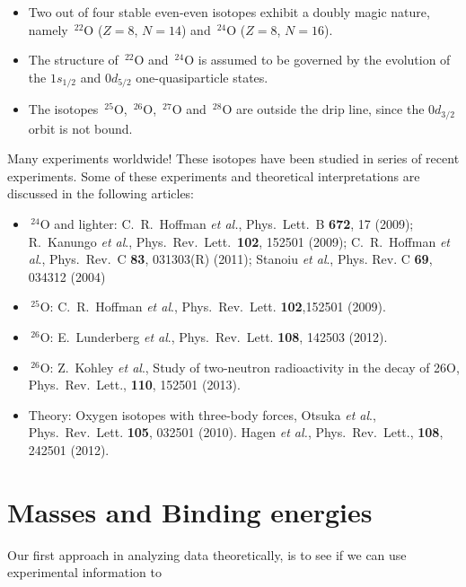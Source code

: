 \documentclass[%
twoside,                 %
final,                   %
10pt]{article}
\begin{document}
\begin{itemize}
\item Two out of four stable even-even isotopes exhibit a doubly magic nature, namely $\,{}^{22}\mbox{O}$ ($Z=8$, $N=14$) and $\,{}^{24}\mbox{O}$ ($Z=8$, $N=16$).

\item The structure of $\,{}^{22}\mbox{O}$ and $\,{}^{24}\mbox{O}$ is assumed to be governed by the evolution of the $1s_{1/2}$ and $0d_{5/2}$  one-quasiparticle states.

\item The isotopes $\,{}^{25}\mbox{O}$, $\,{}^{26}\mbox{O}$, $\,{}^{27}\mbox{O}$ and $\,{}^{28}\mbox{O}$ are outside the drip line, since the $0d_{3/2}$ orbit is not bound.
\end{itemize}

\noindent
 Many experiments worldwide!
These isotopes have been studied in series of recent experiments. Some of these experiments and theoretical interpretations are discussed in the following articles:

\begin{itemize}
\item $\,{}^{24}\mbox{O}$ and lighter:  C.~R.~Hoffman \emph{et al.}, Phys.~Lett.~B \textbf{672}, 17 (2009); R.~Kanungo \emph{et al}., Phys.~Rev.~Lett.~\textbf{102}, 152501 (2009); C.~R.~Hoffman \emph{et al}., Phys.~Rev.~C \textbf{83}, 031303(R) (2011); Stanoiu \emph{et al}., Phys. Rev. C \textbf{69}, 034312 (2004)

\item $\,{}^{25}\mbox{O}$: C.~R.~Hoffman \emph{et al}., Phys.~Rev.~Lett. \textbf{102},152501  (2009). 

\item $\,{}^{26}\mbox{O}$: E.~Lunderberg \emph{et al}., Phys.~Rev.~Lett. \textbf{108}, 142503 (2012). 

\item $\,{}^{26}\mbox{O}$: Z.~Kohley  \emph{et al}., Study of two-neutron radioactivity in the decay of 26O, Phys.~Rev.~Lett., \textbf{110}, 152501 (2013). 

\item Theory: Oxygen isotopes with three-body forces,  Otsuka \emph{et al}., Phys.~Rev.~Lett. \textbf{105}, 032501  (2010).  Hagen \emph{et al.}, Phys.~Rev.~Lett., \textbf{108}, 242501 (2012). 
\end{itemize}

\noindent
\section*{Masses and Binding energies}
Our first approach in analyzing data theoretically, is to see if we can use experimental information to 
\end{document}
